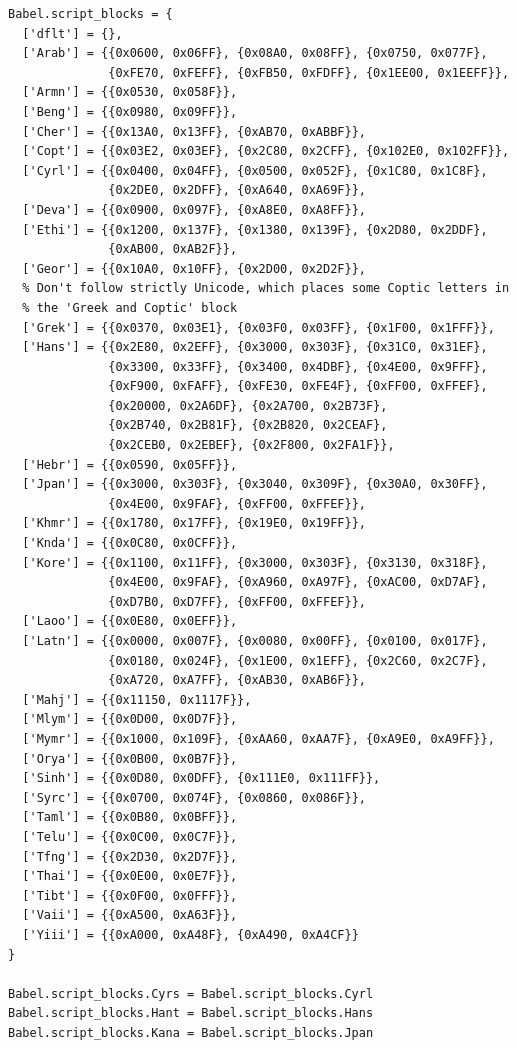 \documentclass[12pt, twoside]{article}
\begin{document}
\begin{lstlisting}[language={[5.2]Lua},  escapechar=£, caption={Babel table script\_blocks}, label=lst:BabelTableScriptBlocks]
Babel.script_blocks = {
  ['dflt'] = {},
  ['Arab'] = {{0x0600, 0x06FF}, {0x08A0, 0x08FF}, {0x0750, 0x077F},
              {0xFE70, 0xFEFF}, {0xFB50, 0xFDFF}, {0x1EE00, 0x1EEFF}},
  ['Armn'] = {{0x0530, 0x058F}},
  ['Beng'] = {{0x0980, 0x09FF}},
  ['Cher'] = {{0x13A0, 0x13FF}, {0xAB70, 0xABBF}},
  ['Copt'] = {{0x03E2, 0x03EF}, {0x2C80, 0x2CFF}, {0x102E0, 0x102FF}},
  ['Cyrl'] = {{0x0400, 0x04FF}, {0x0500, 0x052F}, {0x1C80, 0x1C8F},
              {0x2DE0, 0x2DFF}, {0xA640, 0xA69F}},
  ['Deva'] = {{0x0900, 0x097F}, {0xA8E0, 0xA8FF}},
  ['Ethi'] = {{0x1200, 0x137F}, {0x1380, 0x139F}, {0x2D80, 0x2DDF},
              {0xAB00, 0xAB2F}},
  ['Geor'] = {{0x10A0, 0x10FF}, {0x2D00, 0x2D2F}},
  % Don't follow strictly Unicode, which places some Coptic letters in
  % the 'Greek and Coptic' block
  ['Grek'] = {{0x0370, 0x03E1}, {0x03F0, 0x03FF}, {0x1F00, 0x1FFF}},
  ['Hans'] = {{0x2E80, 0x2EFF}, {0x3000, 0x303F}, {0x31C0, 0x31EF},
              {0x3300, 0x33FF}, {0x3400, 0x4DBF}, {0x4E00, 0x9FFF},
              {0xF900, 0xFAFF}, {0xFE30, 0xFE4F}, {0xFF00, 0xFFEF},
              {0x20000, 0x2A6DF}, {0x2A700, 0x2B73F},
              {0x2B740, 0x2B81F}, {0x2B820, 0x2CEAF},
              {0x2CEB0, 0x2EBEF}, {0x2F800, 0x2FA1F}},
  ['Hebr'] = {{0x0590, 0x05FF}},
  ['Jpan'] = {{0x3000, 0x303F}, {0x3040, 0x309F}, {0x30A0, 0x30FF},
              {0x4E00, 0x9FAF}, {0xFF00, 0xFFEF}},
  ['Khmr'] = {{0x1780, 0x17FF}, {0x19E0, 0x19FF}},
  ['Knda'] = {{0x0C80, 0x0CFF}},
  ['Kore'] = {{0x1100, 0x11FF}, {0x3000, 0x303F}, {0x3130, 0x318F},
              {0x4E00, 0x9FAF}, {0xA960, 0xA97F}, {0xAC00, 0xD7AF},
              {0xD7B0, 0xD7FF}, {0xFF00, 0xFFEF}},
  ['Laoo'] = {{0x0E80, 0x0EFF}},
  ['Latn'] = {{0x0000, 0x007F}, {0x0080, 0x00FF}, {0x0100, 0x017F},
              {0x0180, 0x024F}, {0x1E00, 0x1EFF}, {0x2C60, 0x2C7F},
              {0xA720, 0xA7FF}, {0xAB30, 0xAB6F}},
  ['Mahj'] = {{0x11150, 0x1117F}},
  ['Mlym'] = {{0x0D00, 0x0D7F}},
  ['Mymr'] = {{0x1000, 0x109F}, {0xAA60, 0xAA7F}, {0xA9E0, 0xA9FF}},
  ['Orya'] = {{0x0B00, 0x0B7F}},
  ['Sinh'] = {{0x0D80, 0x0DFF}, {0x111E0, 0x111FF}},
  ['Syrc'] = {{0x0700, 0x074F}, {0x0860, 0x086F}},
  ['Taml'] = {{0x0B80, 0x0BFF}},
  ['Telu'] = {{0x0C00, 0x0C7F}},
  ['Tfng'] = {{0x2D30, 0x2D7F}},
  ['Thai'] = {{0x0E00, 0x0E7F}},
  ['Tibt'] = {{0x0F00, 0x0FFF}},
  ['Vaii'] = {{0xA500, 0xA63F}},
  ['Yiii'] = {{0xA000, 0xA48F}, {0xA490, 0xA4CF}}
}

Babel.script_blocks.Cyrs = Babel.script_blocks.Cyrl
Babel.script_blocks.Hant = Babel.script_blocks.Hans
Babel.script_blocks.Kana = Babel.script_blocks.Jpan

\end{lstlisting}
\end{document}
